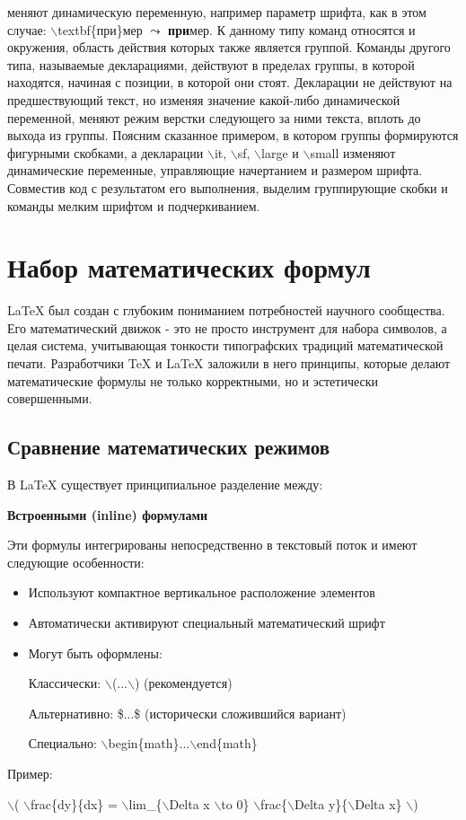 \documentclass[a4paper, 14pt]{extarticle}
\newcommand{\n}{\par}
\begin{document}
	меняют динамическую переменную, например параметр шрифта, как в
	этом случае: $\backslash$textbf\{при\}мер $\leadsto$ \textbf{при}мер. К данному типу команд
	относятся и окружения, область действия которых также является
	группой.
	Команды другого типа, называемые декларациями, действуют в пределах группы, в которой находятся, начиная с позиции, в которой
	они стоят. Декларации не действуют на предшествующий текст, но
	изменяя значение какой-либо динамической переменной, меняют режим
	верстки следующего за ними текста, вплоть до выхода из группы.
	Поясним сказанное примером, в котором группы формируются
	фигурными скобками, а декларации $\backslash$it, $\backslash$sf, $\backslash$large и $\backslash$small изменяют динамические переменные, управляющие начертанием и размером
	шрифта. Совместив код с результатом его выполнения, выделим группирующие скобки и команды мелким шрифтом и подчеркиванием.
	
	\section{Набор математических формул}
	\LaTeX{} был создан с глубоким пониманием потребностей научного сообщества. Его математический движок - это не просто инструмент для набора символов, а целая система, учитывающая тонкости типографских традиций математической печати. Разработчики \TeX{} и \LaTeX{} заложили в него принципы, которые делают математические формулы не только корректными, но и эстетически совершенными.
	
	\subsection*{Сравнение математических режимов}
	В \LaTeX{} существует принципиальное разделение между:\n
	\textbf{Встроенными (inline) формулами} \n
	Эти формулы интегрированы непосредственно в текстовый поток и имеют следующие особенности:
	\begin{itemize}
	\item Используют компактное вертикальное расположение элементов
	
	\item Автоматически активируют специальный математический шрифт
	
	\item Могут быть оформлены:\n
	
		Классически: $\backslash$(...$\backslash$) (рекомендуется)\n
	
		Альтернативно: \$...\$ (исторически сложившийся вариант)\n
	
		Специально: $\backslash$begin\{math\}...$\backslash$end\{math\}
	\end{itemize}
	Пример:\n
	$\backslash$( $\backslash$frac\{dy\}\{dx\} = $\backslash$lim\_\{$\backslash$Delta x $\backslash$to 0\} $\backslash$frac\{$\backslash$Delta y\}\{$\backslash$Delta x\} $\backslash$)
	
\end{document}
